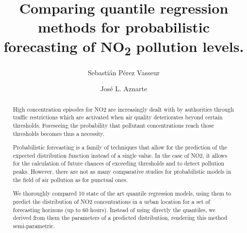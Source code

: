 \documentclass[a4paper,3p,sort&compress]{elsarticle}
\begin{document}
\linenumbers

\newcommand{\no}{NO\textsubscript{2}\xspace}

\begin{frontmatter}

  \title{Comparing quantile regression methods for probabilistic forecasting of \no pollution levels.}


  \author{Sebasti\'an P\'erez Vasseur}
  \author{Jos\'e L. Aznarte}
  \address{Artificial Intelligence Department\\Universidad Nacional de
    Educaci\'on a Distancia --- UNED\\c/ Juan del Rosal, 16, Madrid, Spain}
  
 
\begin{abstract}

High concentration episodes for NO2 are increasingly dealt with by authorities
through traffic restrictions which are activated when air quality deteriorates
beyond certain thresholds. Foreseeing the probability that pollutant
concentrations reach those thresholds becomes thus a necessity.

Probabilistic forecasting is a family of techniques that allow for the
prediction of the expected distribution function instead of a single value. In
the case of NO2, it allows for the calculation of future chances of exceeding
thresholds and to detect pollution peaks. However, there are not as many comparative 
studies for probabilistic models in the field of air pollution as for punctual ones. 

We thoroughly compared 10 state of the art quantile regression models,
using them to predict the distribution of NO2 concentrations in a urban location
for a set of forecasting horizons (up to 60 hours). Instead of using directly the 
quantiles, we derived from them the parameters of a predicted distribution, rendering this 
method semi-parametric.


\end{abstract}
\end{frontmatter}
\end{document}
